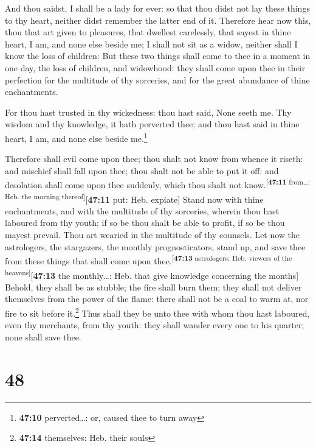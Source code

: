  And thou saidst, I shall be a lady for ever: so that thou
didst not lay these things to thy heart, neither didst remember the
latter end of it.  Therefore hear now this, thou that art
given to pleasures, that dwellest carelessly, that sayest in thine
heart, I am, and none else beside me; I shall not sit as a widow,
neither shall I know the loss of children:  But these two
things shall come to thee in a moment in one day, the loss of children,
and widowhood: they shall come upon thee in their perfection for the
multitude of thy sorceries, and for the great abundance of thine
enchantments.

 For thou hast trusted in thy wickedness: thou hast said,
None seeth me. Thy wisdom and thy knowledge, it hath perverted thee; and
thou hast said in thine heart, I am, and none else beside me.\footnote{\textbf{47:10}
  perverted\ldots: or, caused thee to turn away}

 Therefore shall evil come upon thee; thou shalt not know
from whence it riseth: and mischief shall fall upon thee; thou shalt not
be able to put it off: and desolation shall come upon thee suddenly,
which thou shalt not know.\textsuperscript{{[}\textbf{47:11} from\ldots:
Heb. the morning thereof{]}}{[}\textbf{47:11} put: Heb. expiate{]}
 Stand now with thine enchantments, and with the
multitude of thy sorceries, wherein thou hast laboured from thy youth;
if so be thou shalt be able to profit, if so be thou mayest prevail.
 Thou art wearied in the multitude of thy counsels. Let
now the astrologers, the stargazers, the monthly prognosticators, stand
up, and save thee from these things that shall come upon
thee.\textsuperscript{{[}\textbf{47:13} astrologers: Heb. viewers of the
heavens{]}}{[}\textbf{47:13} the monthly\ldots: Heb. that give knowledge
concerning the months{]}  Behold, they shall be as
stubble; the fire shall burn them; they shall not deliver themselves
from the power of the flame: there shall not be a coal to warm at, nor
fire to sit before it.\footnote{\textbf{47:14} themselves: Heb. their
  souls}  Thus shall they be unto thee with whom thou
hast laboured, even thy merchants, from thy youth: they shall wander
every one to his quarter; none shall save thee.

\hypertarget{section-47}{%
\section{48}\label{section-47}}

